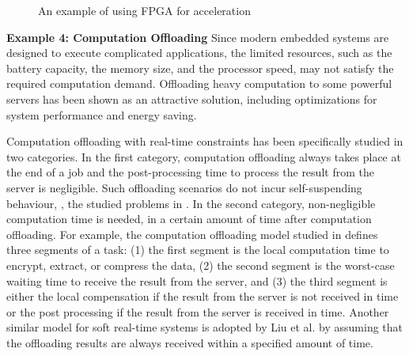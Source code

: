 \begin{figure}[t]
{{}       }
  \caption{An example of using FPGA for acceleration}
  \label{fig:example-fpga}
\end{figure}


{\bf Example 4: Computation Offloading}
Since modern embedded systems are designed to execute complicated applications, the limited resources, such as the battery capacity, the memory size, and the processor speed, may not satisfy the required computation demand. Offloading heavy computation to some powerful servers has been shown as an attractive solution, including optimizations for system performance and energy saving.

Computation offloading with real-time constraints has been specifically studied in two categories. In the first category, computation offloading always takes place at the end of a job and the post-processing time to process the result from the server is negligible. Such offloading scenarios do not incur self-suspending behaviour, \eg, the studied problems in \cite{nimmagadda2010real,DBLP:conf/ecrts/TomaC13}. In the second category, non-negligible computation time is needed, in a certain amount of time after computation offloading. For example, the computation offloading model studied in \cite{Liu_2014} defines three segments of a task: (1) the first segment is the local computation time to encrypt, extract, or compress the data, (2) the second segment is the worst-case waiting time to receive the result from the server, and (3) the third segment is either the local compensation if the result from the server is not received in time or the post processing if the result from the server is received in time. Another similar model for soft real-time systems is adopted by Liu et al. \cite{DBLP:conf/ecrts/LiuLZGH015} by assuming that the offloading results are always received within a specified amount of time.

